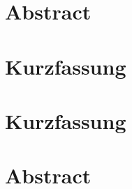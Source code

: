 

\ifeng
	\chapter*{Abstract}
\else
	\chapter*{Kurzfassung}
\fi



\pagebreak

{
	\let\clearpage\relax
	\ifeng
		\chapter*{Kurzfassung}
	\else
		\chapter*{Abstract}
	\fi


	

	\ifeng
	\else
	\fi
}
